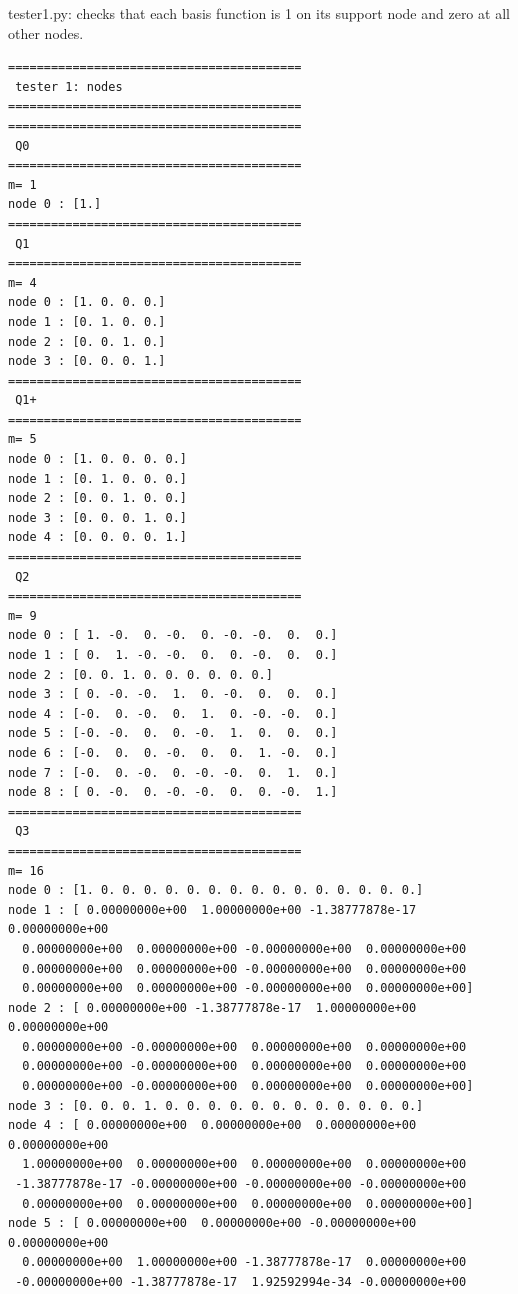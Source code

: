 {\pythonfile tester1.py}: checks that each basis function is 1 on its support node and zero at all other nodes.



\begin{scriptsize}
\begin{verbatim}
=========================================
 tester 1: nodes
=========================================
=========================================
 Q0
=========================================
m= 1
node 0 : [1.]
=========================================
 Q1
=========================================
m= 4
node 0 : [1. 0. 0. 0.]
node 1 : [0. 1. 0. 0.]
node 2 : [0. 0. 1. 0.]
node 3 : [0. 0. 0. 1.]
=========================================
 Q1+
=========================================
m= 5
node 0 : [1. 0. 0. 0. 0.]
node 1 : [0. 1. 0. 0. 0.]
node 2 : [0. 0. 1. 0. 0.]
node 3 : [0. 0. 0. 1. 0.]
node 4 : [0. 0. 0. 0. 1.]
=========================================
 Q2
=========================================
m= 9
node 0 : [ 1. -0.  0. -0.  0. -0. -0.  0.  0.]
node 1 : [ 0.  1. -0. -0.  0.  0. -0.  0.  0.]
node 2 : [0. 0. 1. 0. 0. 0. 0. 0. 0.]
node 3 : [ 0. -0. -0.  1.  0. -0.  0.  0.  0.]
node 4 : [-0.  0. -0.  0.  1.  0. -0. -0.  0.]
node 5 : [-0. -0.  0.  0. -0.  1.  0.  0.  0.]
node 6 : [-0.  0.  0. -0.  0.  0.  1. -0.  0.]
node 7 : [-0.  0. -0.  0. -0. -0.  0.  1.  0.]
node 8 : [ 0. -0.  0. -0. -0.  0.  0. -0.  1.]
=========================================
 Q3
=========================================
m= 16
node 0 : [1. 0. 0. 0. 0. 0. 0. 0. 0. 0. 0. 0. 0. 0. 0. 0.]
node 1 : [ 0.00000000e+00  1.00000000e+00 -1.38777878e-17  0.00000000e+00
  0.00000000e+00  0.00000000e+00 -0.00000000e+00  0.00000000e+00
  0.00000000e+00  0.00000000e+00 -0.00000000e+00  0.00000000e+00
  0.00000000e+00  0.00000000e+00 -0.00000000e+00  0.00000000e+00]
node 2 : [ 0.00000000e+00 -1.38777878e-17  1.00000000e+00  0.00000000e+00
  0.00000000e+00 -0.00000000e+00  0.00000000e+00  0.00000000e+00
  0.00000000e+00 -0.00000000e+00  0.00000000e+00  0.00000000e+00
  0.00000000e+00 -0.00000000e+00  0.00000000e+00  0.00000000e+00]
node 3 : [0. 0. 0. 1. 0. 0. 0. 0. 0. 0. 0. 0. 0. 0. 0. 0.]
node 4 : [ 0.00000000e+00  0.00000000e+00  0.00000000e+00  0.00000000e+00
  1.00000000e+00  0.00000000e+00  0.00000000e+00  0.00000000e+00
 -1.38777878e-17 -0.00000000e+00 -0.00000000e+00 -0.00000000e+00
  0.00000000e+00  0.00000000e+00  0.00000000e+00  0.00000000e+00]
node 5 : [ 0.00000000e+00  0.00000000e+00 -0.00000000e+00  0.00000000e+00
  0.00000000e+00  1.00000000e+00 -1.38777878e-17  0.00000000e+00
 -0.00000000e+00 -1.38777878e-17  1.92592994e-34 -0.00000000e+00

\end{verbatim}
\end{scriptsize}
